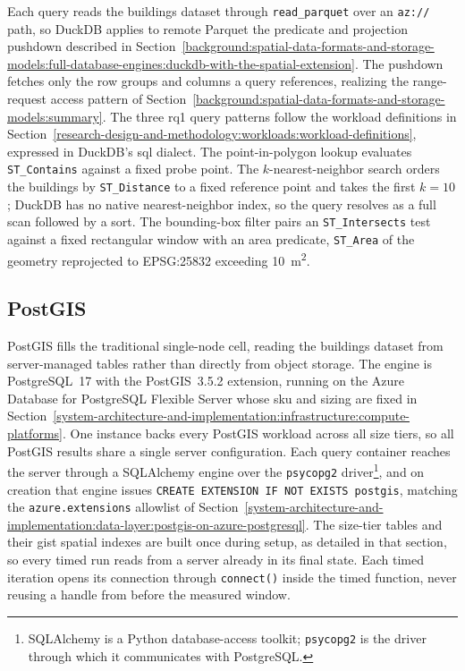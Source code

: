 Each query reads the buildings dataset through \texttt{read\_parquet} over an \texttt{az://} path, so DuckDB applies to remote Parquet the predicate and projection pushdown described in Section~\ref{background:spatial-data-formats-and-storage-models:full-database-engines:duckdb-with-the-spatial-extension}. The pushdown fetches only the row groups and columns a query references, realizing the range-request access pattern of Section~\ref{background:spatial-data-formats-and-storage-models:summary}. The three \acrshort{rq}1 query patterns follow the workload definitions in Section~\ref{research-design-and-methodology:workloads:workload-definitions}, expressed in DuckDB's \acrshort{sql} dialect. The point-in-polygon lookup evaluates \texttt{ST\_Contains} against a fixed probe point. The $k$-nearest-neighbor search orders the buildings by \texttt{ST\_Distance} to a fixed reference point and takes the first $k = \num{10}$; DuckDB has no native nearest-neighbor index, so the query resolves as a full scan followed by a sort. The bounding-box filter pairs an \texttt{ST\_Intersects} test against a fixed rectangular window with an area predicate, \texttt{ST\_Area} of the geometry reprojected to EPSG:25832 exceeding \SI{10}{\meter\squared}.

\subsection{PostGIS}
\label{system-architecture-and-implementation:compute-configuration:postgis}

PostGIS fills the traditional single-node cell, reading the buildings dataset from server-managed tables rather than directly from object storage. The engine is PostgreSQL~17 with the PostGIS~3.5.2 extension, running on the Azure Database for PostgreSQL Flexible Server whose \acrshort{sku} and sizing are fixed in Section~\ref{system-architecture-and-implementation:infrastructure:compute-platforms}. One instance backs every PostGIS workload across all size tiers, so all PostGIS results share a single server configuration. Each query container reaches the server through a SQLAlchemy engine over the \texttt{psycopg2} driver\footnote{SQLAlchemy is a Python database-access toolkit; \texttt{psycopg2} is the driver through which it communicates with PostgreSQL.}, and on creation that engine issues \texttt{CREATE EXTENSION IF NOT EXISTS postgis}, matching the \texttt{azure.extensions} allowlist of Section~\ref{system-architecture-and-implementation:data-layer:postgis-on-azure-postgresql}. The size-tier tables and their \acrshort{gist} spatial indexes are built once during setup, as detailed in that section, so every timed run reads from a server already in its final state. Each timed iteration opens its connection through \texttt{connect()} inside the timed function, never reusing a handle from before the measured window.

